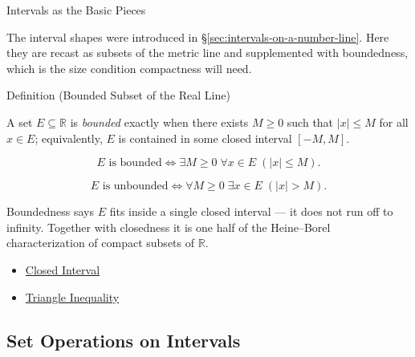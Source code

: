 \label{sec:intervals-as-subsets}

\begin{topicbox}{Intervals as the Basic Pieces}
\begin{exposition}
The interval shapes were introduced in \S\ref{sec:intervals-on-a-number-line}. Here they are recast as subsets of the metric line and supplemented with boundedness, which is the size condition compactness will need.
\end{exposition}
\end{topicbox}
\begin{definitionbox}{Definition (Bounded Subset of the Real Line)}
\begin{definition}
\label{def:bounded-subset-of-r}
A set $E\subseteq\mathbb{R}$ is \emph{bounded} exactly when there exists $M\ge 0$ such that $|x|\le M$ for all $x\in E$; equivalently, $E$ is contained in some closed interval $[-M,M]$.
\end{definition}
\end{definitionbox}
\begin{remark*}
\[
E \text{ is bounded} \Longleftrightarrow \exists M\ge 0\;\forall x\in E\;(|x|\le M).
\]
\end{remark*}
\begin{remark*}
\[
E \text{ is unbounded} \Longleftrightarrow \forall M\ge 0\;\exists x\in E\;(|x|>M).
\]
\end{remark*}
\begin{remark*}[Interpretation]
Boundedness says $E$ fits inside a single closed interval --- it does not run off to infinity. Together with closedness it is one half of the Heine--Borel characterization of compact subsets of $\mathbb{R}$.
\end{remark*}
\begin{dependencies}
\begin{itemize}
  \item \hyperref[def:closed-interval]{Closed Interval}
  \item \hyperref[thm:triangle-inequality]{Triangle Inequality}
\end{itemize}
\end{dependencies}

\subsection*{Set Operations on Intervals}
\label{subsec:set-operations-on-intervals}


